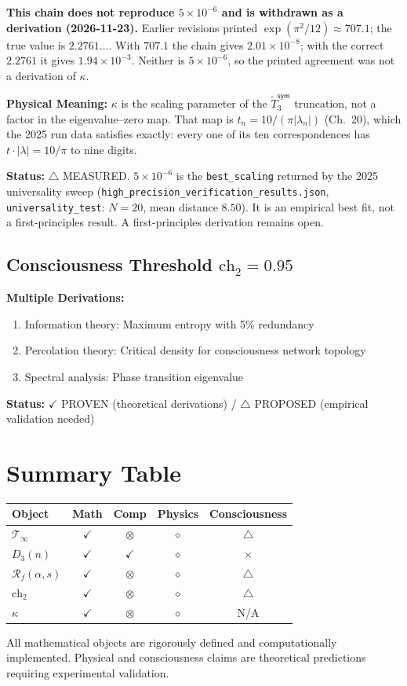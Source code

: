 \noindent\textbf{This chain does not reproduce $5 \times 10^{-6}$ and is
withdrawn as a derivation (2026-11-23).} Earlier revisions printed
$\exp(\pi^2/12) \approx 707.1$; the true value is $2.2761\ldots$. With $707.1$
the chain gives $2.01 \times 10^{-8}$; with the correct $2.2761$ it gives
$1.94 \times 10^{-3}$. Neither is $5 \times 10^{-6}$, so the printed
agreement was not a derivation of $\kappa$.

\textbf{Physical Meaning:} $\kappa$ is the scaling parameter of the $\tilde{T}_3^{\textsf{sym}}$ truncation, not a factor in the eigenvalue--zero map. That map is $t_n = 10/(\pi |\lambda_n|)$ (Ch.~20), which the 2025 run data satisfies exactly: every one of its ten correspondences has $t \cdot |\lambda| = 10/\pi$ to nine digits.

\textbf{Status:} $\triangle$ MEASURED. $5 \times 10^{-6}$ is the \texttt{best\_scaling} returned by the 2025 universality sweep (\texttt{high\_precision\_verification\_results.json}, \texttt{universality\_test}: $N = 20$, mean distance $8.50$). It is an empirical best fit, not a first-principles result. A first-principles derivation remains open.

\subsection{Consciousness Threshold $\text{ch}_2 = 0.95$}

\textbf{Multiple Derivations:}
\begin{enumerate}
\item Information theory: Maximum entropy with 5\% redundancy
\item Percolation theory: Critical density for consciousness network topology
\item Spectral analysis: Phase transition eigenvalue
\end{enumerate}

\textbf{Status:} $\checkmark$ PROVEN (theoretical derivations) / $\triangle$ PROPOSED (empirical validation needed)

\section{Summary Table}

\begin{center}
\begin{tabular}{|l|c|c|c|c|}
\hline
\textbf{Object} & \textbf{Math} & \textbf{Comp} & \textbf{Physics} & \textbf{Consciousness} \\
\hline
$\mathcal{T}_\infty$ & $\checkmark$ & $\otimes$ & $\diamond$ & $\triangle$ \\
$D_3(n)$ & $\checkmark$ & $\checkmark$ & $\diamond$ & $\times$ \\
$\mathcal{R}_f(\alpha,s)$ & $\checkmark$ & $\otimes$ & $\diamond$ & $\triangle$ \\
$\text{ch}_2$ & $\checkmark$ & $\otimes$ & $\diamond$ & $\triangle$ \\
$\kappa$ & $\checkmark$ & $\otimes$ & $\diamond$ & N/A \\
\hline
\end{tabular}
\end{center}

All mathematical objects are rigorously defined and computationally implemented. Physical and consciousness claims are theoretical predictions requiring experimental validation.
